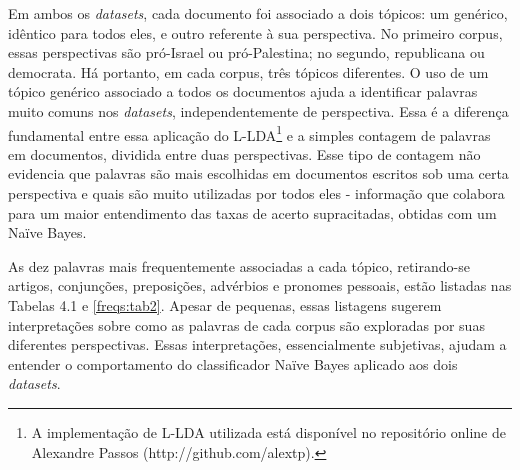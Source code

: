 
Em ambos os \emph{datasets}, cada documento foi associado a dois tópicos: um genérico, idêntico para todos eles, e outro referente à sua perspectiva. No primeiro corpus, essas perspectivas são pró-Israel ou pró-Palestina; no segundo, republicana ou democrata. Há portanto, em cada corpus, três tópicos diferentes. O uso de um tópico genérico associado a todos os documentos ajuda a identificar palavras muito comuns nos \emph{datasets}, independentemente de perspectiva. Essa é a diferença fundamental entre essa aplicação do L-LDA\footnote{A implementação de L-LDA utilizada está disponível no repositório online de Alexandre Passos (http://github.com/alextp).} e a simples contagem de palavras em documentos, dividida entre duas perspectivas. Esse tipo de contagem não evidencia que palavras são mais escolhidas em documentos escritos sob uma certa perspectiva e quais são muito utilizadas por todos eles - informação que colabora para um maior entendimento das taxas de acerto supracitadas, obtidas com um Naïve Bayes. 


As dez palavras mais frequentemente associadas a cada tópico, retirando-se artigos, conjunções, preposições, advérbios e pronomes pessoais, estão listadas nas Tabelas 4.1 e \ref{freqs:tab2}. Apesar de pequenas, essas listagens sugerem interpretações sobre como as palavras de cada corpus são exploradas por suas diferentes perspectivas. Essas interpretações, essencialmente  subjetivas, ajudam a entender o comportamento do classificador Naïve Bayes aplicado aos dois \emph{datasets}.%




